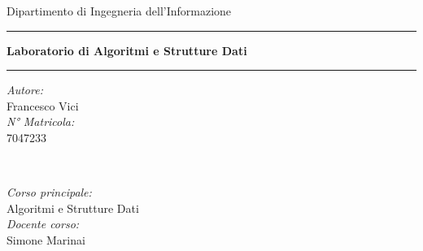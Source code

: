 

\begin{titlepage}
	
	Dipartimento di Ingegneria dell'Informazione
	
	\hrule
	
	\begin{align-c}
		\textbf{ Laboratorio di Algoritmi e Strutture Dati}
	\end{align-c}
	
	\hrule
	
	\vspace{20pt}
	
	\begin{minipage}{0.4\textwidth}
		\begin{flushleft} \large
			\emph{Autore:}\\
			Francesco Vici %
			\\[1.2em]
			\emph{N° Matricola:}\\
			7047233 \\[1.2em]
		\end{flushleft}
	\end{minipage}
	~
	\begin{minipage}{0.4\textwidth}
		\begin{flushright} \large
			\emph{Corso principale:} \\
			Algoritmi e Strutture Dati  \\[1.2em]
			\emph{Docente corso:} \\
			Simone Marinai
		\end{flushright}
	\end{minipage}\\[2cm]
	\makeatother
	
\end{titlepage}


\newpage

\tableofcontents 

\newpage
